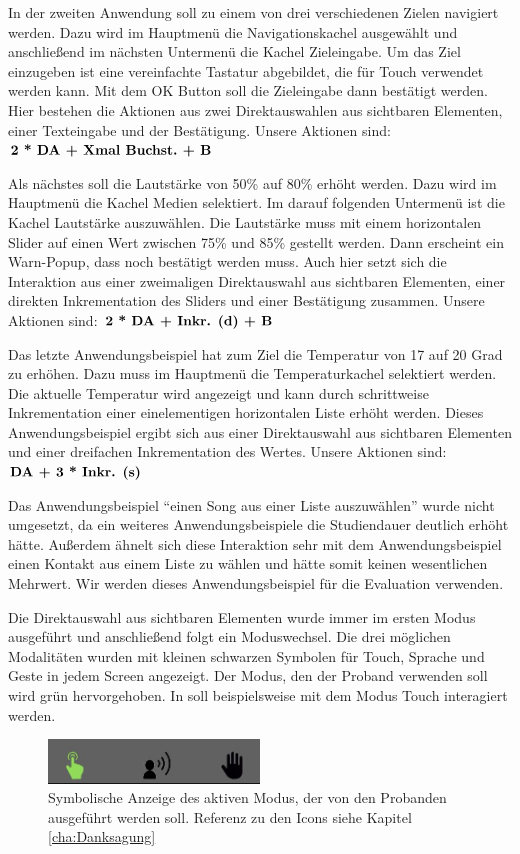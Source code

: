In der zweiten Anwendung soll zu einem von drei verschiedenen Zielen navigiert werden. 
Dazu wird im Hauptmenü die Navigationskachel ausgewählt und anschließend im nächsten Untermenü die Kachel Zieleingabe. 
Um das Ziel einzugeben ist eine vereinfachte Tastatur abgebildet, die für Touch verwendet werden kann. 
Mit dem OK Button soll die Zieleingabe dann bestätigt werden. 
Hier bestehen die Aktionen aus zwei Direktauswahlen aus sichtbaren Elementen, einer Texteingabe und der Bestätigung. 
Unsere Aktionen sind: $\textbf{2 * \text{DA} + \text{Xmal Buchst.} + \text{B}}$

Als nächstes soll die Lautstärke von 50\% auf 80\% erhöht werden. 
Dazu wird im Hauptmenü die Kachel Medien selektiert. 
Im darauf folgenden Untermenü ist die Kachel Lautstärke auszuwählen. 
Die Lautstärke muss mit einem horizontalen Slider auf einen Wert zwischen 75\% und 85\% gestellt werden. 
Dann erscheint ein Warn-Popup, dass noch bestätigt werden muss. 
Auch hier setzt sich die Interaktion aus einer zweimaligen Direktauswahl aus sichtbaren Elementen, einer direkten Inkrementation des Sliders und einer Bestätigung zusammen. Unsere Aktionen sind: $\textbf{2 * \text{DA} + \text{Inkr. (d)} + \text{B}}$

Das letzte Anwendungsbeispiel hat zum Ziel die Temperatur von 17 auf 20 Grad zu erhöhen. 
Dazu muss im Hauptmenü die Temperaturkachel selektiert werden. 
Die aktuelle Temperatur wird angezeigt und kann durch schrittweise Inkrementation einer einelementigen horizontalen Liste erhöht werden. 
Dieses Anwendungsbeispiel ergibt sich aus einer Direktauswahl aus sichtbaren Elementen und einer dreifachen Inkrementation des Wertes. 
Unsere Aktionen sind: $\textbf{\text{DA} + 3 * \text{Inkr. (s)}}$ 

Das Anwendungsbeispiel "`einen Song aus einer Liste auszuwählen"' wurde nicht umgesetzt, da ein weiteres  Anwendungsbeispiele die Studiendauer deutlich erhöht hätte. 
Außerdem ähnelt sich diese Interaktion sehr mit dem Anwendungsbeispiel einen Kontakt aus einem Liste zu wählen und hätte somit keinen wesentlichen Mehrwert. 
Wir werden dieses Anwendungsbeispiel für die Evaluation verwenden.

Die Direktauswahl aus sichtbaren Elementen wurde immer im ersten Modus ausgeführt und anschließend folgt ein Moduswechsel. 
Die drei möglichen Modalitäten wurden mit kleinen schwarzen Symbolen für Touch, Sprache und Geste in jedem Screen angezeigt. 
Der Modus, den der Proband verwenden soll wird grün hervorgehoben. 
In  soll beispielsweise mit dem Modus Touch interagiert werden. 
\begin{figure}[ht]
  \centering
  \includegraphics[width=0.5\textwidth]{img/ModusAktiv.jpg}
  \caption[Symbolische Anzeige des aktiven Modus]{Symbolische Anzeige des aktiven Modus, der von den Probanden ausgeführt werden soll. Referenz zu den Icons siehe Kapitel \ref{cha:Danksagung}}
  \label{fig:ModusAktiv}
\end{figure}

